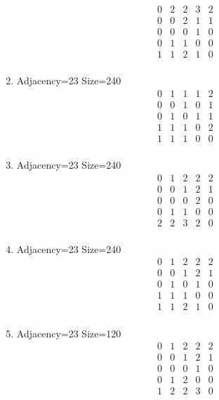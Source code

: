 \documentclass[12pt]{article}
\begin{document}
\begin{multicols}{3}
\begin{enumerate}
\begin{equation*}
\begin{array}{ccccc}
0&2&2&3&2\\
0&0&2&1&1\\
0&0&0&1&0\\
0&1&1&0&0\\
1&1&2&1&0\\
\end{array}
\end{equation*}
\item Adjacency=23 Size=240
\begin{equation*}
\begin{array}{ccccc}
0&1&1&1&2\\
0&0&1&0&1\\
0&1&0&1&1\\
1&1&1&0&2\\
1&1&1&0&0\\
\end{array}
\end{equation*}
\item Adjacency=23 Size=240
\begin{equation*}
\begin{array}{ccccc}
0&1&2&2&2\\
0&0&1&2&1\\
0&0&0&2&0\\
0&1&1&0&0\\
2&2&3&2&0\\
\end{array}
\end{equation*}
\item Adjacency=23 Size=240
\begin{equation*}
\begin{array}{ccccc}
0&1&2&2&2\\
0&0&1&2&1\\
0&1&0&1&0\\
1&1&1&0&0\\
1&1&2&1&0\\
\end{array}
\end{equation*}
\item Adjacency=23 Size=120
\begin{equation*}
\begin{array}{ccccc}
0&1&2&2&2\\
0&0&1&2&1\\
0&0&0&1&0\\
0&1&2&0&0\\
1&2&2&3&0\\
\end{array}

\end{equation*}
\end{enumerate}
\end{multicols}
\end{document}
